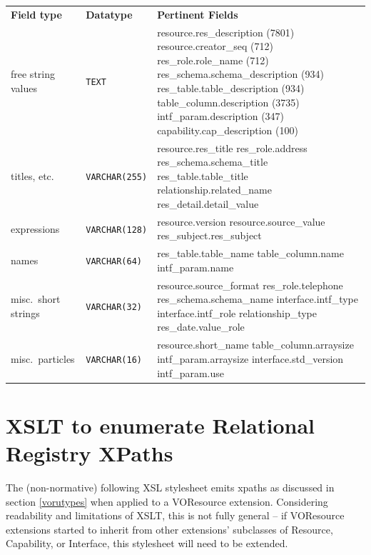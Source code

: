 \documentclass[11pt,a4paper]{ivoa}
\begin{document}
\begin{inlinetable}
\begin{tabular}{llp{6cm}}
\sptablerule
\textbf{Field type}&
\textbf{Datatype}&
\textbf{Pertinent Fields}\\
\sptablerule
free string values&\texttt{TEXT}&resource.res\_description
(7801)\hfil\break
          resource.creator\_seq (712)\hfil\break
          res\_role.role\_name (712)\hfil\break
          res\_schema.schema\_description (934)\hfil\break
          res\_table.table\_description (934)\hfil\break
          table\_column.description (3735)\hfil\break
          intf\_param.description (347)\hfil\break
          capability.cap\_description (100)\\
\sptablerule
titles, etc.&\texttt{VARCHAR(255)}&resource.res\_title\hfil\break
          res\_role.address\hfil\break
          res\_schema.schema\_title\hfil\break
          res\_table.table\_title\hfil\break
          relationship.related\_name\hfil\break
          res\_detail.detail\_value\\
\sptablerule
expressions&\texttt{VARCHAR(128)}&resource.version\hfil\break
          resource.source\_value\hfil\break
          res\_subject.res\_subject\\
\sptablerule
names&\texttt{VARCHAR(64)}&res\_table.table\_name\hfil\break
          table\_column.name\hfil\break
          intf\_param.name\\
\sptablerule
misc.~short strings&\texttt{VARCHAR(32)}&resource.source\_format\hfil\break
          res\_role.telephone\hfil\break
          res\_schema.schema\_name\hfil\break
          interface.intf\_type\hfil\break
          interface.intf\_role\hfil\break
          relationship\_type\hfil\break
          res\_date.value\_role\\
\sptablerule
misc.~particles&\texttt{VARCHAR(16)}&resource.short\_name\hfil\break
          table\_column.arraysize\hfil\break
          intf\_param.arraysize\hfil\break
          interface.std\_version\hfil\break
          intf\_param.use\\
\end{tabular}
\end{inlinetable}

\section{XSLT to enumerate Relational
Registry XPaths}

\label{appMkut}

The (non-normative) following XSL stylesheet emits xpaths as
discussed in section \ref{vorutypes} when applied to a
VOResource extension.  Considering readability and limitations of XSLT, this is
not fully general -- if VOResource extensions started to inherit from other
extensions' subclasses of Resource, Capability, or Interface, this stylesheet
will need to be extended.
\end{document}
